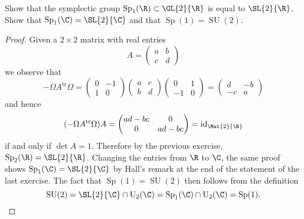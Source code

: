 \documentclass[10pt]{amsart}
\begin{document}
\begin{ex}
  Show that the symplectic group $\operatorname{Sp}_1(\R) \subset \GL{2}{\R}$ is equal to $\SL{2}{\R}$.
  Show that $\operatorname{Sp}_1(\C) = \SL{2}{\C}$ and that $\operatorname{Sp}(1) = \operatorname{SU}(2)$.
  \begin{proof}
    Given a $2 \times 2$ matrix with real entries
    $$A = \left(\begin{matrix}
      a & b\\
      c & d
    \end{matrix}\right)$$
    we observe that
    $$-\Omega A^\text{tr} \Omega = \left(\begin{matrix}
      0 & -1\\
      1 & 0
    \end{matrix}\right)
    \left(\begin{matrix}
      a & c\\
      b & d
    \end{matrix}\right)
    \left(\begin{matrix}
      0 & 1\\
      -1 & 0
    \end{matrix}\right)
    =
    \left(\begin{matrix}
      d & -b\\
      -c & a
    \end{matrix}\right)$$
    and hence 
    $$(-\Omega A^\text{tr} \Omega) A = \left(\begin{matrix}
      ad - bc & 0\\
      0 & ad - bc
    \end{matrix}\right) = \operatorname{id}_{\Mat{2}{\R}}$$
    if and only if $\det{A} = 1$.
    Therefore by the previous exercise, $\operatorname{Sp}_2(\R) = \SL{2}{\R}$.
    Changing the entries from $\R$ to $\C$, the same proof shows $\operatorname{Sp}_1(\C) = \SL{2}{\C}$ by Hall's remark at the end of the statement of the last exercise.
    The fact that $\operatorname{Sp}(1) = \operatorname{SU}(2)$ then follows from the definition 
    $$\operatorname{SU}(2) = \SL{2}{\C} \cap \operatorname{U}_2(\C) = \operatorname{Sp}_1(\C) \cap \operatorname{U}_2(\C) = \operatorname{Sp}(1).$$
  \end{proof}
\end{ex}
\end{document}
